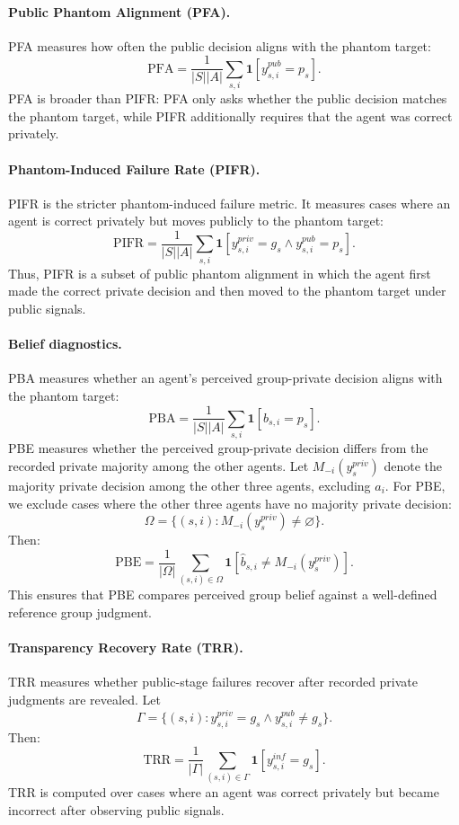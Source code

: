 \documentclass{article}
\begin{document}
\paragraph{Public Phantom Alignment (PFA).}
PFA measures how often the public decision aligns with the phantom target:
\[
\mathrm{PFA}
=
\frac{1}{|S||A|}
\sum_{s,i}
\mathbf{1}[y^{pub}_{s,i}=p_s].
\]
PFA is broader than PIFR: PFA only asks whether the public decision matches the phantom target, while PIFR additionally requires that the agent was correct privately.

\paragraph{Phantom-Induced Failure Rate (PIFR).}
PIFR is the stricter phantom-induced failure metric. It measures cases where an agent is correct privately but moves publicly to the phantom target:
\[
\mathrm{PIFR}
=
\frac{1}{|S||A|}
\sum_{s,i}
\mathbf{1}
\left[
y^{priv}_{s,i}=g_s
\land
y^{pub}_{s,i}=p_s
\right].
\]
Thus, PIFR is a subset of public phantom alignment in which the agent first made the correct private decision and then moved to the phantom target under public signals.

\paragraph{Belief diagnostics.}
PBA measures whether an agent's perceived group-private decision aligns with the phantom target:
\[
\mathrm{PBA}
=
\frac{1}{|S||A|}
\sum_{s,i}
\mathbf{1}[\hat{b}_{s,i}=p_s].
\]
PBE measures whether the perceived group-private decision differs from the recorded private majority among the other agents. Let \(M_{-i}(y^{priv}_{s})\) denote the majority private decision among the other three agents, excluding \(a_i\). For PBE, we exclude cases where the other three agents have no majority private decision:
\[
\Omega=\{(s,i):M_{-i}(y^{priv}_{s})\neq\varnothing\}.
\]
Then:
\[
\mathrm{PBE}
=
\frac{1}{|\Omega|}
\sum_{(s,i)\in\Omega}
\mathbf{1}
\left[
\hat{b}_{s,i}\neq M_{-i}(y^{priv}_{s})
\right].
\]
This ensures that PBE compares perceived group belief against a well-defined
reference group judgment.

\paragraph{Transparency Recovery Rate (TRR).}
TRR measures whether public-stage failures recover after recorded private judgments are revealed. Let
\[
\Gamma=\{(s,i):y^{priv}_{s,i}=g_s
\land y^{pub}_{s,i}\neq g_s\}.
\]
Then:
\[
\mathrm{TRR}
=
\frac{1}{|\Gamma|}
\sum_{(s,i)\in\Gamma}
\mathbf{1}[y^{inf}_{s,i}=g_s].
\]
TRR is computed over cases where an agent was correct privately but became incorrect after observing public signals.
\end{document}
